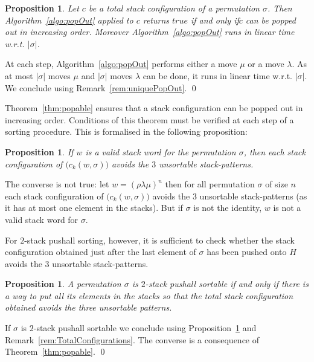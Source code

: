 \documentclass[11pt]{article}
\newenvironment{pf}{{\em \noindent Proof:}}{ \hfill \qed\smallskip}
\newtheorem{prop}[thm]{Proposition}
\newcommand{\pushall}{$2$-stack pushall sortable\xspace}
\newcommand{\ssi}{if and only if\xspace}
\begin{document}
\begin{prop}\label{prop:AlgoPopOut}
Let $c$ be a total stack configuration of a permutation $\sigma$.
Then Algorithm~\ref{algo:popOut} applied to $c$ returns $true$ \ssi $c$ can be popped out in increasing order.
Moreover Algorithm~\ref{algo:popOut} runs in linear time w.r.t. $|\sigma|$.
\end{prop}

\begin{pf}
At each step, Algorithm~\ref{algo:popOut} performs either a move $\mu$ or a move $\lambda$. 
As at most $|\sigma|$ moves $\mu$ and $|\sigma|$ moves $\lambda$ can be done, it runs in linear time w.r.t. $|\sigma|$.
We conclude using Remark~\ref{rem:uniquePopOut}.
\end{pf}


Theorem~\ref{thm:popable} ensures that a stack configuration can be popped out in increasing order. 
Conditions of this theorem must be verified at each step of a sorting procedure. 
This is formalised in the following proposition:

\begin{prop}\label{prop:eachConfigAvoidUnsortablePattern}
If $w$ is a valid stack word for the permutation $\sigma$, 
then each stack configuration of $\big(c_k(w,\sigma)\big)$ avoids the $3$ unsortable stack-patterns.
\end{prop}

The converse is not true: let $w = (\rho \lambda \mu)^n$ then for all permutation $\sigma$ of size $n$ 
each stack configuration of $\big(c_k(w,\sigma)\big)$ avoids the $3$ unsortable stack-patterns (as it has at most one element in the stacks).
But if $\sigma$ is not the identity, $w$ is not a valid stack word for $\sigma$.

For $2$-stack pushall sorting, however, it is sufficient to check whether the stack configuration obtained 
just after the last element of $\sigma$ has been pushed onto $H$ avoids the $3$ unsortable stack-patterns.

\begin{prop}\label{prop:pushallIffConfigurationEvitePatterns}
A permutation $\sigma$ is \pushall if and only if there is a way to put all its elements in the stacks 
so that the total stack configuration obtained avoids the three unsortable patterns.
\end{prop}

\begin{pf}
If $\sigma$ is \pushall we conclude using Proposition~\ref{prop:eachConfigAvoidUnsortablePattern} and Remark~\ref{rem:TotalConfigurations}. 
The converse is a consequence of Theorem~\ref{thm:popable}.
\end{pf}
\end{document}
